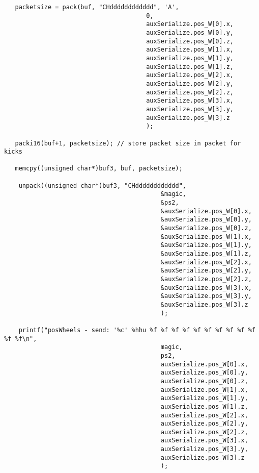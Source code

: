 \begin{verbatim}
   packetsize = pack(buf, "CHdddddddddddd", 'A',
                                       0,
                                       auxSerialize.pos_W[0].x,
                                       auxSerialize.pos_W[0].y,
                                       auxSerialize.pos_W[0].z,
                                       auxSerialize.pos_W[1].x,
                                       auxSerialize.pos_W[1].y,
                                       auxSerialize.pos_W[1].z,
                                       auxSerialize.pos_W[2].x,
                                       auxSerialize.pos_W[2].y,
                                       auxSerialize.pos_W[2].z,
                                       auxSerialize.pos_W[3].x,
                                       auxSerialize.pos_W[3].y,
                                       auxSerialize.pos_W[3].z
                                       );

   packi16(buf+1, packetsize); // store packet size in packet for kicks

   memcpy((unsigned char*)buf3, buf, packetsize);

    unpack((unsigned char*)buf3, "CHdddddddddddd",
                                           &magic,
                                           &ps2,
                                           &auxSerialize.pos_W[0].x,
                                           &auxSerialize.pos_W[0].y,
                                           &auxSerialize.pos_W[0].z,
                                           &auxSerialize.pos_W[1].x,
                                           &auxSerialize.pos_W[1].y,
                                           &auxSerialize.pos_W[1].z,
                                           &auxSerialize.pos_W[2].x,
                                           &auxSerialize.pos_W[2].y,
                                           &auxSerialize.pos_W[2].z,
                                           &auxSerialize.pos_W[3].x,
                                           &auxSerialize.pos_W[3].y,
                                           &auxSerialize.pos_W[3].z
                                           );

    printf("posWheels - send: '%c' %hhu %f %f %f %f %f %f %f %f %f %f %f %f\n",
                                           magic,
                                           ps2,
                                           auxSerialize.pos_W[0].x,
                                           auxSerialize.pos_W[0].y,
                                           auxSerialize.pos_W[0].z,
                                           auxSerialize.pos_W[1].x,
                                           auxSerialize.pos_W[1].y,
                                           auxSerialize.pos_W[1].z,
                                           auxSerialize.pos_W[2].x,
                                           auxSerialize.pos_W[2].y,
                                           auxSerialize.pos_W[2].z,
                                           auxSerialize.pos_W[3].x,
                                           auxSerialize.pos_W[3].y,
                                           auxSerialize.pos_W[3].z
                                           );


\end{verbatim}
